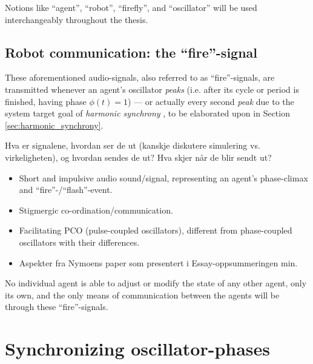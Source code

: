 		Notions like ``agent'', ``robot'', ``firefly'', and ``oscillator'' will be used interchangeably throughout the thesis.



	\subsection{Robot communication: the ``fire''-signal}
	\label{subsec:fire_signal}
	
	These aforementioned audio-signals, also referred to as ``fire''-signals, are transmitted whenever an agent's oscillator \textit{peaks} (i.e. after its cycle or period is finished, having phase $\phi(t)=1$) — or actually every second \textit{peak} due to the system target goal of \textit{harmonic synchrony}
, to be elaborated upon in Section \ref{sec:harmonic_synchrony}.

	Hva er signalene, hvordan ser de ut (kanskje diskutere simulering vs. virkeligheten), og hvordan sendes de ut? Hva skjer når de blir sendt ut?
	
		\begin{itemize}
			\item Short and impulsive audio sound/signal, representing an agent's phase-climax and ``fire''-/``flash''-event.
			\item Stigmergic co-ordination/communication.
			\item Facilitating PCO (pulse-coupled oscillators), different from phase-coupled oscillators with their differences.
			\item Aspekter fra Nymoens paper som presentert i Essay-oppsummeringen min.
		\end{itemize}
	
	No individual agent is able to adjust or modify the state of any other agent, only its own, and the only means of communication between the agents will be through these ``fire''-signals.
	
	
	
	
	
	
	
	
	
	




\section{Synchronizing oscillator-phases}
\label{sec:phase_methods}


